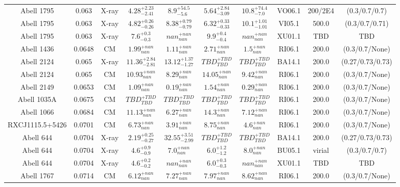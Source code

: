\begin{table}
\begin{tabular}{cccccccccc}
Abell 1795 & 0.063 & X-ray & ${4.28}^{+2.23}_{-2.41}$ & ${8.9}^{+54.5}_{-5.6}$ & ${5.64}^{+2.84}_{-3.09}$ & ${10.8}^{+74.4}_{-7.0}$ & VO06.1 & 200/2E4 & (0.3/0.7/0.7) \\
Abell 1795 & 0.063 & X-ray & ${4.82}^{+0.26}_{-0.26}$ & ${8.38}^{+0.79}_{-0.79}$ & ${6.32}^{+0.33}_{-0.33}$ & ${10.1}^{+1.01}_{-1.01}$ & VI05.1 & 500.0 & (0.3/0.7/0.71) \\
Abell 1795 & 0.063 & X-ray & ${7.6}^{+0.3}_{-0.3}$ & ${nan}^{+nan}_{nan}$ & ${9.9}^{+0.4}_{-0.4}$ & ${nan}^{+nan}_{nan}$ & XU01.1 & TBD & TBD \\
Abell 1436 & 0.0648 & CM & ${1.99}^{+nan}_{nan}$ & ${1.11}^{+nan}_{nan}$ & ${2.71}^{+nan}_{nan}$ & ${1.5}^{+nan}_{nan}$ & RI06.1 & 200.0 & (0.3/0.7/None) \\
Abell 2124 & 0.065 & X-ray & ${11.36}^{+2.84}_{-2.81}$ & ${13.12}^{+1.37}_{-1.27}$ & ${TBD}^{+TBD}_{TBD}$ & ${TBD}^{+TBD}_{TBD}$ & BA14.1 & 200.0 & (0.27/0.73/0.73) \\
Abell 2124 & 0.065 & CM & ${10.93}^{+nan}_{nan}$ & ${8.29}^{+nan}_{nan}$ & ${14.05}^{+nan}_{nan}$ & ${9.42}^{+nan}_{nan}$ & RI06.1 & 200.0 & (0.3/0.7/None) \\
Abell 2149 & 0.0653 & CM & ${1.09}^{+nan}_{nan}$ & ${0.19}^{+nan}_{nan}$ & ${1.54}^{+nan}_{nan}$ & ${0.29}^{+nan}_{nan}$ & RI06.1 & 200.0 & (0.3/0.7/None) \\
Abell 1035A & 0.0675 & CM & ${TBD}^{+TBD}_{TBD}$ & ${TBD}^{+TBD}_{TBD}$ & ${TBD}^{+TBD}_{TBD}$ & ${TBD}^{+TBD}_{TBD}$ & RI06.1 & 200.0 & (0.3/0.7/None) \\
Abell 1066 & 0.0684 & CM & ${11.13}^{+nan}_{nan}$ & ${6.27}^{+nan}_{nan}$ & ${14.3}^{+nan}_{nan}$ & ${7.12}^{+nan}_{nan}$ & RI06.1 & 200.0 & (0.3/0.7/None) \\
RXCJ1115.5+5426 & 0.0701 & CM & ${6.73}^{+nan}_{nan}$ & ${3.91}^{+nan}_{nan}$ & ${8.75}^{+nan}_{nan}$ & ${4.6}^{+nan}_{nan}$ & RI06.1 & 200.0 & (0.3/0.7/None) \\
Abell 644 & 0.0704 & X-ray & ${2.19}^{+0.25}_{-0.27}$ & ${32.55}^{+3.51}_{-2.99}$ & ${TBD}^{+TBD}_{TBD}$ & ${TBD}^{+TBD}_{TBD}$ & BA14.1 & 200.0 & (0.27/0.73/0.73) \\
Abell 644 & 0.0704 & X-ray & ${4.6}^{+0.9}_{-0.9}$ & ${7.0}^{+nan}_{nan}$ & ${6.0}^{+1.2}_{-1.2}$ & ${8.0}^{+nan}_{nan}$ & BU05.1 & virial & (0.3/0.7/0.7) \\
Abell 644 & 0.0704 & X-ray & ${4.6}^{+0.2}_{-0.2}$ & ${nan}^{+nan}_{nan}$ & ${6.0}^{+0.3}_{-0.3}$ & ${nan}^{+nan}_{nan}$ & XU01.1 & TBD & TBD \\
Abell 1767 & 0.0714 & CM & ${6.12}^{+nan}_{nan}$ & ${7.27}^{+nan}_{nan}$ & ${7.97}^{+nan}_{nan}$ & ${8.62}^{+nan}_{nan}$ & RI06.1 & 200.0 & (0.3/0.7/None) \\

\end{tabular}
\end{table}
